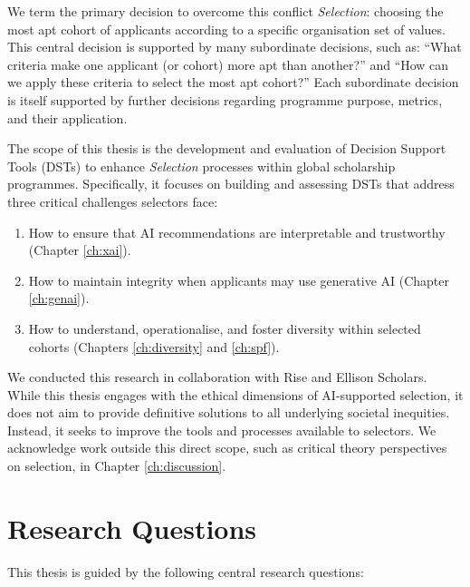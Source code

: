 We term the primary decision to overcome this conflict \emph{Selection}: choosing the most apt cohort of applicants according to a specific organisation set of values. This central decision is supported by many subordinate decisions, such as: ``What criteria make one applicant (or cohort) more apt than another?'' and ``How can we apply these criteria to select the most apt cohort?'' Each subordinate decision is itself supported by further decisions regarding programme purpose, metrics, and their application.

The scope of this thesis is the development and evaluation of Decision Support Tools (DSTs) to enhance \emph{Selection} processes within global scholarship programmes. Specifically, it focuses on building and assessing DSTs that address three critical challenges selectors face:

\begin{enumerate}
    \item How to ensure that AI recommendations are interpretable and trustworthy (Chapter \ref{ch:xai}).
    \item How to maintain integrity when applicants may use generative AI (Chapter \ref{ch:genai}).
    \item How to understand, operationalise, and foster diversity within selected cohorts (Chapters \ref{ch:diversity} and \ref{ch:spf}).
\end{enumerate}

We conducted this research in collaboration with Rise and Ellison Scholars. While this thesis engages with the ethical dimensions of AI-supported selection, it does not aim to provide definitive solutions to all underlying societal inequities. Instead, it seeks to improve the tools and processes available to selectors. We acknowledge work outside this direct scope, such as critical theory perspectives on selection, in Chapter \ref{ch:discussion}.

\section{Research Questions}

This thesis is guided by the following central research questions:

